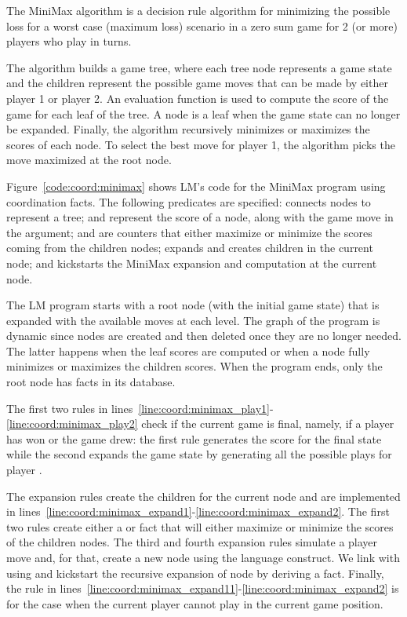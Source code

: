 The MiniMax algorithm is a decision rule algorithm for minimizing the possible
loss for a worst case (maximum loss) scenario in a zero sum game for 2 (or more)
players who play in turns.

The algorithm builds a game tree, where each tree node represents a game state
and the children represent the possible game moves that can be made by either
player 1 or player 2.  An evaluation function is used to compute the score of
the game for each leaf of the tree. A node is a leaf when the game state can no
longer be expanded. Finally, the algorithm recursively minimizes or maximizes
the scores of each node. To select the best move for player 1, the algorithm
picks the move maximized at the root node.

Figure~\ref{code:coord:minimax} shows LM's code for the MiniMax program using
coordination facts. The following predicates are specified: 
connects nodes to represent a tree;  and
 represent the score of a node, along with the
game move in the  argument;  and  are
counters that either maximize or minimize the scores coming from the children
nodes;  expands and creates children in the current node; and
 kickstarts the MiniMax expansion and computation at the current node.

The LM program starts with a root node (with the initial game state) that is
expanded with the available moves at each level. The graph of the program is
dynamic since nodes are created and then deleted once they are no longer needed.
The latter happens when the leaf scores are computed or when a node fully
minimizes or maximizes the children scores. When the program ends, only the root
node has facts in its database.

The first two rules in
lines~\ref{line:coord:minimax_play1}-\ref{line:coord:minimax_play2} check if the
current game is final, namely, if a player has won or the game drew: the first
rule generates the score for the final state while the second expands the game
state by generating all the possible plays for player .

The expansion rules create the children for the current node and are
implemented in
lines~\ref{line:coord:minimax_expand1}-\ref{line:coord:minimax_expand2}. The
first two rules create either a  or  fact that
will either maximize or minimize the scores of the children nodes.  The third
and fourth expansion rules simulate a player move and, for that, create a new
node  using the  language construct. We link  with
 using  and kickstart the recursive expansion of node
 by deriving a  fact. Finally, the rule in
lines~\ref{line:coord:minimax_expand11}-\ref{line:coord:minimax_expand2} is for
the case when the current player cannot play in the current game position.

